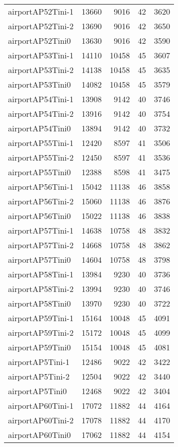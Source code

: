 \begin{tabular}{lrrrr}
airportAP52Tini-1 & 13660 & 9016 & 42 & 3620 \\
airportAP52Tini-2 & 13690 & 9016 & 42 & 3650 \\
airportAP52Tini0 & 13630 & 9016 & 42 & 3590 \\
airportAP53Tini-1 & 14110 & 10458 & 45 & 3607 \\
airportAP53Tini-2 & 14138 & 10458 & 45 & 3635 \\
airportAP53Tini0 & 14082 & 10458 & 45 & 3579 \\
airportAP54Tini-1 & 13908 & 9142 & 40 & 3746 \\
airportAP54Tini-2 & 13916 & 9142 & 40 & 3754 \\
airportAP54Tini0 & 13894 & 9142 & 40 & 3732 \\
airportAP55Tini-1 & 12420 & 8597 & 41 & 3506 \\
airportAP55Tini-2 & 12450 & 8597 & 41 & 3536 \\
airportAP55Tini0 & 12388 & 8598 & 41 & 3475 \\
airportAP56Tini-1 & 15042 & 11138 & 46 & 3858 \\
airportAP56Tini-2 & 15060 & 11138 & 46 & 3876 \\
airportAP56Tini0 & 15022 & 11138 & 46 & 3838 \\
airportAP57Tini-1 & 14638 & 10758 & 48 & 3832 \\
airportAP57Tini-2 & 14668 & 10758 & 48 & 3862 \\
airportAP57Tini0 & 14604 & 10758 & 48 & 3798 \\
airportAP58Tini-1 & 13984 & 9230 & 40 & 3736 \\
airportAP58Tini-2 & 13994 & 9230 & 40 & 3746 \\
airportAP58Tini0 & 13970 & 9230 & 40 & 3722 \\
airportAP59Tini-1 & 15164 & 10048 & 45 & 4091 \\
airportAP59Tini-2 & 15172 & 10048 & 45 & 4099 \\
airportAP59Tini0 & 15154 & 10048 & 45 & 4081 \\
airportAP5Tini-1 & 12486 & 9022 & 42 & 3422 \\
airportAP5Tini-2 & 12504 & 9022 & 42 & 3440 \\
airportAP5Tini0 & 12468 & 9022 & 42 & 3404 \\
airportAP60Tini-1 & 17072 & 11882 & 44 & 4164 \\
airportAP60Tini-2 & 17078 & 11882 & 44 & 4170 \\
airportAP60Tini0 & 17062 & 11882 & 44 & 4154 \\

\end{tabular}
